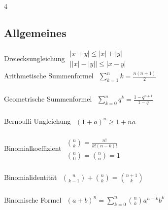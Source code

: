 \documentclass[6pt,a4paper]{scrartcl}
\newcommand{\abs}[1]{\ensuremath{\left\vert#1\right\vert}}
\begin{document}
\begin{multicols*}{4}

	\subsection{Allgemeines}

	Dreiecksungleichung \qquad \qquad \qquad
	\begin{math}\begin{array}{l}
			\abs{x + y} \le \abs{x} + \abs{y} \\
			\abs{\abs{x}- \abs{y}} \le \abs{x-y}
		\end{array}\end{math} \\
	Arithmetische Summenformel \qquad
	\begin{math}\begin{array}{l}
			\sum\limits_{k = 1}^{n}k = \frac{n (n+1)}{2}
		\end{array}\end{math}  \\
	\\
	Geometrische Summenformel \qquad
	\begin{math}\begin{array}{l}
			\sum\limits_{k = 0}^{n}q^k = \frac{1 - q^{n+1}}{1-q}
		\end{array}\end{math}\\
	\\
	Bernoulli-Ungleichung \qquad \qquad \quad
	\begin{math}\begin{array}{l}
			(1+a)^n \ge 1 + na
		\end{array}\end{math}\\
	\\
	Binomialkoeffizient \qquad \qquad \qquad
	\begin{math}\begin{array}{l}
			\binom{n}{k} = \frac{n!}{k!(n-k)!} \\
			\binom{n}{0} = \binom{n}{n} = 1
		\end{array}\end{math}\\
	\\
	Binomialidentität \qquad \qquad \qquad \quad
	\begin{math}\begin{array}{l}
			\binom{n}{k-1}+\binom{n}{k} = \binom{n+1}{k}
		\end{array}\end{math}\\
	\\
	Binomische Formel \qquad \qquad \qquad
	\begin{math}\begin{array}{l}
			(a+b)^n = \sum\limits_{k = 0}^{n} \binom{n}{k} a^{n-k} b^{k}
		\end{array}\end{math}   \\


\end{multicols*}
\end{document}
